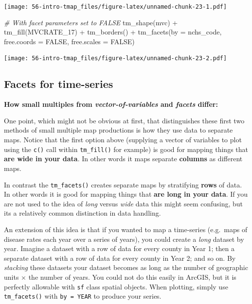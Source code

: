 \documentclass[
]{book}
\newenvironment{Shaded}{\begin{snugshade}}{\end{snugshade}}
\newcommand{\AttributeTok}[1]{\textcolor[rgb]{0.77,0.63,0.00}{#1}}
\newcommand{\CommentTok}[1]{\textcolor[rgb]{0.56,0.35,0.01}{\textit{#1}}}
\newcommand{\ConstantTok}[1]{\textcolor[rgb]{0.00,0.00,0.00}{#1}}
\newcommand{\FunctionTok}[1]{\textcolor[rgb]{0.00,0.00,0.00}{#1}}
\newcommand{\NormalTok}[1]{#1}
\newcommand{\SpecialCharTok}[1]{\textcolor[rgb]{0.00,0.00,0.00}{#1}}
\newcommand{\StringTok}[1]{\textcolor[rgb]{0.31,0.60,0.02}{#1}}
\begin{document}
\texttt{[image: 56-intro-tmap\_files/figure-latex/unnamed-chunk-23-1.pdf]}

\begin{Shaded}
\begin{Highlighting}[]
\CommentTok{\# With facet parameters set to FALSE}
\FunctionTok{tm\_shape}\NormalTok{(mvc) }\SpecialCharTok{+}
  \FunctionTok{tm\_fill}\NormalTok{(}\StringTok{\textquotesingle{}MVCRATE\_17\textquotesingle{}}\NormalTok{) }\SpecialCharTok{+}
  \FunctionTok{tm\_borders}\NormalTok{() }\SpecialCharTok{+}
  \FunctionTok{tm\_facets}\NormalTok{(}\AttributeTok{by =} \StringTok{\textquotesingle{}nchs\_code\textquotesingle{}}\NormalTok{, }\AttributeTok{free.coords =} \ConstantTok{FALSE}\NormalTok{, }\AttributeTok{free.scales =} \ConstantTok{FALSE}\NormalTok{)}
\end{Highlighting}
\end{Shaded}

\texttt{[image: 56-intro-tmap\_files/figure-latex/unnamed-chunk-23-2.pdf]}

\hypertarget{facets-for-time-series}{%
\subsection{Facets for time-series}\label{facets-for-time-series}}

\textbf{How small multiples from \emph{vector-of-variables} and \emph{facets} differ:}

One point, which might not be obvious at first, that distinguishes these first two methods of small multiple map productions is how they use data to separate maps. Notice that the first option above (supplying a vector of variables to plot using the \texttt{c()} call within \texttt{tm\_fill()} for example) is good for mapping things that \textbf{are wide in your data}. In other words it maps separate \textbf{columns} as different maps.

In contrast the \texttt{tm\_facets()} creates separate maps by stratifying \textbf{rows} of data. In other words it is good for mapping things that \textbf{are long in your data}. If you are not used to the idea of \emph{long} versus \emph{wide} data this might seem confusing, but its a relatively common distinction in data handling.

An extension of this idea is that if you wanted to map a time-series (e.g.~maps of disease rates each year over a series of years), you could create a \emph{long} dataset by year. Imagine a dataset with a row of data for every county in Year 1; then a separate dataset with a row of data for every county in Year 2; and so on. By \emph{stacking} these datasets your dataset becomes as long as the number of geographic units \(\times\) the number of years. You could not do this easily in ArcGIS, but it is perfectly allowable with \texttt{sf} class spatial objects. When plotting, simply use \texttt{tm\_facets()} with \texttt{by\ =\ YEAR} to produce your series.
\end{document}
